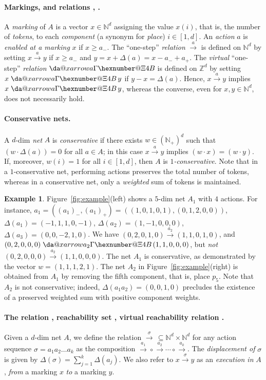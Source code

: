 \documentclass[11pt,a4paper]{amsart}
\makeatletter
\DeclareMathOperator{\Reach}{Reach}
\newcommand{\step}[1]{\mathrel{\xrightarrow{#1}}}
\newcommand{\virtual}[1]{\mathrel{\xdashrightarrow{#1}}\hspace{-0.3em}}
\newcommand{\Nat}{\mathbb{N}}
\newcommand{\Zset}{\mathbb{Z}}
\newcommand{\setN}{\Nat}
\newcommand{\setZ}{\Zset}
\newcommand{\scalar}[2]{(#1 \cdot #2)}
\newcommand*{\da@rightarrow}{\mathchar"0\hexnumber@\symAMSa 4B }
\newcommand*{\xdashrightarrow}[2][]{%
  \mathrel{%
    \mathpalette{\da@xarrow{#1}{#2}{}\da@rightarrow{\,}{}}{}%
  }%
}
\newcommand*{\da@xarrow}[7]{%
  \sbox0{$\ifx#7\scriptstyle\scriptscriptstyle\else\scriptstyle\fi#5#1#6\m@th$}%
  \sbox2{$\ifx#7\scriptstyle\scriptscriptstyle\else\scriptstyle\fi#5#2#6\m@th$}%
  \sbox4{$#7\dabar@\m@th$}%
  \dimen@=\wd0 %
  \ifdim\wd2 >\dimen@
    \dimen@=\wd2 %
  \fi
  \count@=2 %
  \def\da@bars{\dabar@\dabar@}%
  \@whiledim\count@\wd4<\dimen@\do{%
    \advance\count@\@ne
    \expandafter\def\expandafter\da@bars\expandafter{%
      \da@bars
      \dabar@ 
    }%
  }%
  \mathrel{#3}%
  \mathrel{%
    \mathop{\da@bars}\limits
    \ifx\\#1\\%
    \else
      _{\copy0}%
    \fi
    \ifx\\#2\\%
    \else
      ^{\copy2}%
    \fi
  }%
  \mathrel{#4}%
}
\theoremstyle{plain}
\theoremstyle{definition}
\newtheorem{exa}[thm]{Example}
\theoremstyle{defC}
\theoremstyle{thmC}
\makeatother
\begin{document}
\paragraph{Markings, and relations  \bm{$\step{a}$},
\bm{$\xdashrightarrow{a}$}.}
A \emph{marking} of $A$ is a vector $x\in\Nat^d$ assigning the value $x(i)$, that is, the number of \emph{tokens}, to each \emph{component} (a synonym for \emph{place}) $i\in[1,d]$.
An \emph{action} $a$ is
\emph{enabled at a marking} $x$ if $x\geq a_-$.
The ``one-step'' \emph{relation} $\step{a}$
 is defined on $\setN^d$  by setting ${x}\step{a}{y}$
if  $x\geq a_-$ and $y=x+\Delta(a)=x-a_-+a_+$.
The \emph{virtual} ``one-step'' \emph{relation} $\virtual{a}$
 is defined on $\setZ^d$  by setting ${x}\virtual{a}{y}$
if  $y-x=\Delta(a)$.
Hence, $x \step{a} y$ implies $x \virtual{a} y$, whereas the converse, even for $x,y \in \setN^d$, does not necessarily hold.

\paragraph{Conservative nets.}
A $d$-dim \emph{net} $A$ is \emph{conservative} if there exists
$w\in(\setN_+)^d$ such that $\scalar{w}{\Delta(a)}=0$ for all $a\in A$;
in this case  ${x}\step{a}{y}$ implies $\scalar{w}{x}=\scalar{w}{y}$.
If, moreover, $w(i)=1$ for all $i\in[1,d]$, then $A$ is \emph{$1$-conservative}.
Note that in a $1$-conservative net, performing actions preserves the
total number of tokens, whereas in a conservative net, only a \emph{weighted} sum of tokens is maintained.

\begin{exa}\label{exa:basicnet}
Figure~\ref{fig:example}(left) shows
a $5$-dim net $A_1$ with $4$ actions. 
For instance,
$a_1=
\left((a_1)_-,(a_1)_+\right)=
\left((1,0,1,0,1),(0,1,2,0,0)\right)$,
$\Delta(a_1)=({-}1,1,1,0,{-}1)$,
	$\Delta(a_2)=(1,{-}1,0,0,0)$,
$\Delta(a_3)=(0,0,{-}2,1,0)$.
We have 
$(0,2,0,1,0)\step{a_2}(1,1,0,1,0)$, and
	$(0,2,0,0,0)\virtual{a_2}(1,1,0,0,0)$,
	but \emph{not}
$(0,2,0,0,0)\step{a_2}(1,1,0,0,0)$.
The net $A_1$ is conservative, as demonstrated by the vector 
$w=(1,1,1,2,1)$.
The net $A_2$ in Figure~\ref{fig:example}(right)
	is obtained from $A_1$ by removing the fifth component, that
	is, 
	place $p_5$. Note that $A_2$ is 
	not
	conservative; indeed, $\Delta(a_1a_2)=(0,0,1,0)$ precludes the
	existence of a preserved 
 weighted sum with positive component weights.
\end{exa}

\paragraph{The relation \bm{$\step{\sigma}$}, 
reachability set \bm{$\Reach(x)$}, virtual reachability relation
\bm{$\xdashrightarrow{\sigma}$}.}
Given a $d$-dim net $A$,
we define the relation
$\step{\sigma}\, \subseteq \setN^d\times\setN^d$
for any action sequence $\sigma=a_1a_2\ldots a_k$
as the
composition $\step{a_1}\circ\step{a_2}\cdots\circ\step{a_k}$.
The \emph{displacement of} $\sigma$ is given by 
$\Delta(\sigma)=\sum_{j=1}^k \Delta(a_j).$
We also refer to $x\step{\sigma}y$ as an
\emph{execution in} $A$, \emph{from} a marking $x$ \emph{to} a marking $y$.
\end{document}
